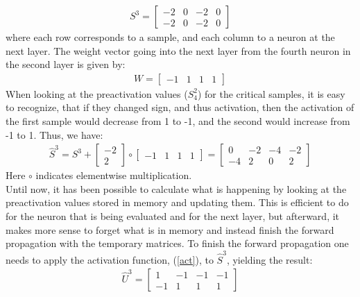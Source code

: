 \begin{align*}
    S^3 = 
    \begin{bmatrix}
        -2 & 0 & -2 & 0 \\
        -2 & 0 & -2 & 0 
    \end{bmatrix}
\end{align*}
where each row corresponds to a sample, and each column to a neuron at the next layer. The weight vector going into the next layer from the fourth neuron in the second layer is given by:
\begin{align*}
    W = 
    \begin{bmatrix}
        -1 & 1 & 1 & 1
    \end{bmatrix}
\end{align*}
When looking at the preactivation values ($S_4^2$) for the critical samples, it is easy to recognize, that if they changed sign, and thus activation, then the activation of the first sample would decrease from 1 to -1, and the second would increase from -1 to 1. Thus, we have:
\begin{align*}
    \hat{S}^3 = S^3 + 
    \begin{bmatrix}
        -2 \\
        2
    \end{bmatrix}
    \circ 
    \begin{bmatrix}
        -1 & 1 & 1 & 1 
    \end{bmatrix}
    = 
    \begin{bmatrix}
        0 & -2 & -4 & -2 \\
        -4 & 2 & 0 & 2 
    \end{bmatrix}
\end{align*}
Here $\circ$ indicates elementwise multiplication. \\
\noindent Until now, it has been possible to calculate what is happening by looking at the preactivation values stored in memory and updating them. This is efficient to do for the neuron that is being evaluated and for the next layer, but afterward, it makes more sense to forget what is in memory and instead finish the forward propagation with the temporary matrices. To finish the forward propagation one needs to apply the activation function, (\ref{act}), to $\hat{S}^3$, yielding the result: 
\begin{align*}
    \hat{U}^3 = 
    \begin{bmatrix}
        1 & -1 & -1 & -1 \\
        -1 & 1 & 1 & 1 
    \end{bmatrix}
\end{align*}
